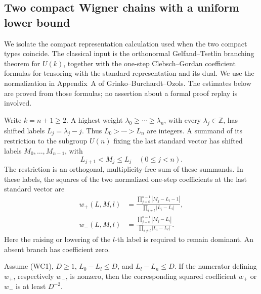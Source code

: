 \subsection{Two compact Wigner chains with a uniform lower bound}
\label{sec:archimedean-wigner-two-chain}

We isolate the compact representation calculation used when the two
compact types coincide. The classical input is the orthonormal
Gelfand--Tsetlin branching theorem for \(U(k)\), together with the
one-step Clebsch--Gordan coefficient formulas for tensoring with the
standard representation and its dual. We use the normalization in
Appendix~A of Grinko--Burchardt--Ozols.\cite{grinko-burchardt-ozols-wigner}
The estimates below are proved from those formulas; no assertion about
a formal proof replay is involved.

Write \(k=n+1\ge2\). A highest weight
\(\lambda_0\ge\cdots\ge\lambda_n\), with every \(\lambda_j\in\mathbb Z\),
has shifted labels \(L_j=\lambda_j-j\).
Thus \(L_0>\cdots>L_n\) are integers. A summand of its
restriction to the subgroup \(U(n)\) fixing the last standard vector
has shifted labels \(M_0,\ldots,M_{n-1}\), with
\[
                 L_{j+1}<M_j\le L_j\quad(0\le j<n).
                                                        \tag{WC1}
\]
The restriction is an orthogonal, multiplicity-free sum of these
summands. In these labels, the squares of the two normalized one-step
coefficients at the last standard vector are
\[
 \begin{split}
 w_+(L,M,l)&=
 \frac{\prod_{j=0}^{n-1}|M_j-L_l-1|}
      {\prod_{i\ne l}|L_i-L_l|},\\
 w_-(L,M,l)&=
 \frac{\prod_{j=0}^{n-1}|M_j-L_l|}
      {\prod_{i\ne l}|L_i-L_l|}.
 \end{split}                                           \tag{WC2}
\]
Here the raising or lowering of the \(l\)-th label is required to
remain dominant. An absent branch has coefficient zero.

\begin{lemma}
\label{lem:wigner-one-step-lower}
Assume (WC1), \(D\ge1\),
\(L_0-L_l\le D\), and \(L_l-L_n\le D\).
If the numerator defining \(w_+\), respectively \(w_-\), is nonzero,
then the corresponding squared coefficient \(w_+\) or \(w_-\)
is at least \(D^{-2}\).
\end{lemma}

